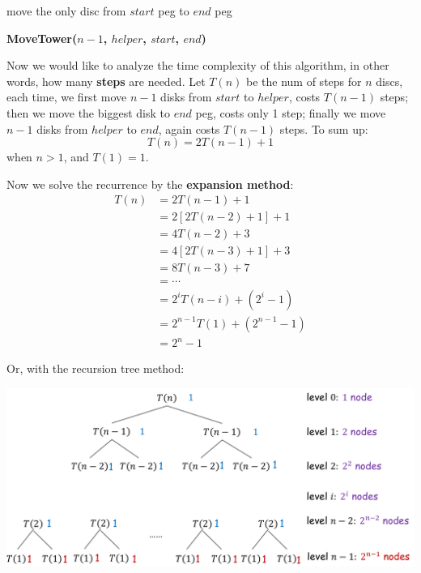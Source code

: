 \documentclass[11pt, a4paper]{COMP3711}
\begin{document}
\begin{spacing}{1.5}
\begin{algorithm}
{            move the only disc from $start$ peg to $end$ peg

            {}
            {}
            {\bf MoveTower($n-1$, $helper$, $start$, $end$)}
        }
    \end{algorithm}

    Now we would like to analyze the time complexity of this algorithm,
    in other words, how many {\bf steps} are needed.
    Let $T(n)$ be the num of steps for $n$ discs, each time, 
    we first move $n-1$ disks from $start$ to $helper$, 
    costs $T(n-1)$ steps; then we move the biggest disk to $end$ peg,
    costs only 1 step; finally we move $n-1$ disks from $helper$
    to $end$, again costs $T(n-1)$ steps. To sum up:
    $$T(n)=2T(n-1)+1$$ when $n>1$, and $T(1)=1$.

    Now we solve the recurrence by the {\bf expansion method}:
    \begin{align*}
        T(n) &= 2T(n-1) + 1\\
             &= 2[2T(n-2)+1] + 1\\
             &= 4T(n-2)+3\\
             &= 4[2T(n-3)+1] + 3 \\
             &= 8T(n-3) + 7\\
             &= \cdots \\
             &= 2^i T(n-i) + (2^i-1)\\
             &= 2^{n-1} T(1) + (2^{n-1}-1)\\
             &= 2^n-1
    \end{align*}

    Or, with the recursion tree method:
    \begin{center}
        \includegraphics[scale=0.2]{images/02-hanoi-tree.jpeg}
    \end{center}
    

\end{spacing}
\end{document}
